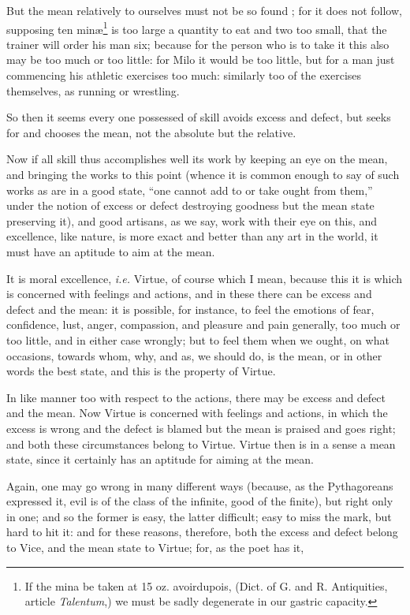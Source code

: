 But the mean relatively to ourselves must not be so found ; for it does not
follow, supposing ten minæ\footnote{If the mina be taken at 15 oz. avoirdupois, (Dict. of G. and R. Antiquities,
article \emph{Talentum},) we must be sadly degenerate in our gastric capacity.}
is too large a quantity to eat and two too small, that the trainer will order
his man six; because for the person who is to take it this also may be too much
or too little: for Milo it would be too little, but for a man just commencing
his athletic exercises too much: similarly too of the exercises themselves, as
running or wrestling.

So then it seems every one possessed of skill avoids excess and defect, but
seeks for and chooses the mean, not the absolute but the relative.

Now if all skill thus accomplishes well its work by keeping an eye on the mean,
and bringing the works to this point (whence it is common enough to say of such
works as are in a good state, “one cannot add to or take ought from
them,” under the notion of excess or defect destroying goodness but the
mean state preserving it), and good artisans, as we say, work with their eye on
this, and excellence, like nature, is more exact and better than any art in the
world, it must have an aptitude to aim at the mean.

It is moral excellence, \emph{i.e.} Virtue, of course which I mean, because
this it is which is concerned with feelings and actions, and in these there can
be excess and defect and the mean: it is possible, for instance, to feel the
emotions of fear, confidence, lust, anger, compassion, and pleasure and pain
generally, too much or too little, and in either case wrongly; but to feel them
when we ought, on what occasions, towards whom, why, and as, we should do, is
the mean, or in other words the best state, and this is the property of Virtue.

In like manner too with respect to the actions, there may be excess and defect
and the mean. Now Virtue is concerned with feelings and actions, in which the
excess is wrong and the defect is blamed but the mean is praised and goes
right; and both these circumstances belong to Virtue. Virtue then is in a sense
a mean state, since it certainly has an aptitude for aiming at the mean.

Again, one may go wrong in many different ways (because, as the Pythagoreans
expressed it, evil is of the class of the infinite, good of the finite), but
right only in one; and so the former is easy, the latter difficult; easy to
miss the mark, but hard to hit it: and for these reasons, therefore, both the
excess and defect belong to Vice, and the mean state to Virtue; for, as the
poet has it,

